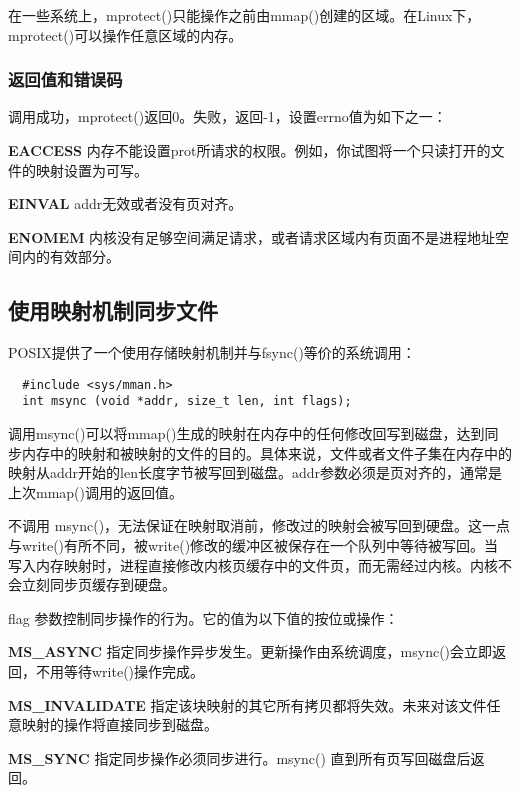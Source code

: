 在一些系统上，mprotect()只能操作之前由mmap()创建的区域。在Linux下，mprotect()可以操作任意区域的内存。

\subsubsection{返回值和错误码}

调用成功，mprotect()返回0。失败，返回-1，设置errno值为如下之一：

\begin{eqlist*}
\item[\textbf{EACCESS}] 内存不能设置prot所请求的权限。例如，你试图将一个只读打开的文件的映射设置为可写。
\item[\textbf{EINVAL}] addr无效或者没有页对齐。
\item[\textbf{ENOMEM}] 内核没有足够空间满足请求，或者请求区域内有页面不是进程地址空间内的有效部分。
\end{eqlist*}

\subsection{使用映射机制同步文件}

POSIX提供了一个使用存储映射机制并与fsync()等价的系统调用：

\begin{lstlisting}
  #include <sys/mman.h>
  int msync (void *addr, size_t len, int flags);
\end{lstlisting}

调用msync()可以将mmap()生成的映射在内存中的任何修改回写到磁盘，达到同步内存中的映射和被映射的文件的目的。具体来说，文件或者文件子集在内存中的映射从addr开始的len长度字节被写回到磁盘。addr参数必须是页对齐的，通常是上次mmap()调用的返回值。

不调用 msync()，无法保证在映射取消前，修改过的映射会被写回到硬盘。这一点与write()有所不同，被write()修改的缓冲区被保存在一个队列中等待被写回。当写入内存映射时，进程直接修改内核页缓存中的文件页，而无需经过内核。内核不会立刻同步页缓存到硬盘。

flag 参数控制同步操作的行为。它的值为以下值的按位或操作：

\begin{eqlist*}
\item[\textbf{MS\_ASYNC}] 指定同步操作异步发生。更新操作由系统调度，msync()会立即返回，不用等待write()操作完成。
\item[\textbf{MS\_INVALIDATE}] 指定该块映射的其它所有拷贝都将失效。未来对该文件任意映射的操作将直接同步到磁盘。
\item[\textbf{MS\_SYNC}] 指定同步操作必须同步进行。msync() 直到所有页写回磁盘后返回。
\end{eqlist*}

